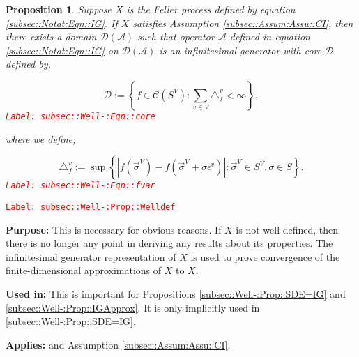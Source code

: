 \documentclass[12pt]{article}
\newcommand{\mc}{\mathcal}
\newcommand{\ep}{\epsilon}
\newcommand{\tr}{\textcolor{red}}
\newcommand{\labe}[1]{\tr{\texttt{Label: #1}}}
\newcommand{\purpose}{\textbf{Purpose: }}
\newcommand{\usein}{\textbf{Used in: }}
\newcommand{\app}{\textbf{Applies: }}
\newcommand{\defeq}{:=}								%
\renewcommand{\v}{v}							%
\renewcommand{\S}{S}							%
\newcommand{\s}{\sigma}							%
\newcommand{\sv}{\vec{\s}}						%
\newcommand{\ev}{\ep}							%
\newcommand{\X}{X}								%
\newcommand{\IG}{\mc{A}}						%
\newcommand{\f}{f}								%
\newcommand{\vind}[1]{^{#1}}					%
\newcommand{\carp}[1]{^{#1}}					%
\newcommand{\vsi}[1]{^{#1}}						%
\newcommand{\core}{\mc{D}}						%
\newcommand{\cont}{\mc{C}}						%
\newcommand{\delt}{\triangle}					%
\newcommand{\deltf}[1]{_{#1}}					%
\newtheorem{prop}[thms]{Proposition}
\begin{document}
\begin{prop}
Suppose \(\X\) is the Feller process defined by equation \eqref{subsec::Notat:Eqn::IG}. If \(\X\) satisfies Assumption \ref{subsec::Assum:Assu::CI}, then there exists a domain \(\core(\IG)\) such that operator \(\IG\) defined in equation \eqref{subsec::Notat:Eqn::IG} on \(\mc{D}(\IG)\) is an infinitesimal generator with core \(\core\) defined by,

\begin{equation}
\core \defeq \left\{f \in \cont(\S\carp{V}): \sum_{\v\in V} \delt\deltf{\f}\vind{\v} < \infty\right\},
\label{subsec::Well-:Eqn::core}
\end{equation}
\labe{subsec::Well-:Eqn::core}

where we define,

\begin{equation}
\delt\deltf{\f}\vind{\v} \defeq \sup\left\{|f(\sv\vsi{V}) - f(\sv\vsi{V}+\s\ev\vind{\v})|: \sv\vsi{V} \in \S\carp{V},\s \in \S\right\}.
\label{subsec::Well-:Eqn::fvar}
\end{equation}
\labe{subsec::Well-:Eqn::fvar}

\label{subsec::Well-:Prop::Welldef}
\end{prop}
\labe{subsec::Well-:Prop::Welldef}

\purpose This is necessary for obvious reasons. If \(\X\) is not well-defined, then there is no longer any point in deriving any results about its properties. The infinitesimal generator representation of \(\X\) is used to prove convergence of the finite-dimensional approximations of \(\X\) to \(\X\).

\usein This is important for Propositions \ref{subsec::Well-:Prop::SDE=IG} and \ref{subsec::Well-:Prop::IGApprox}. It is only implicitly used in \ref{subsec::Well-:Prop::SDE=IG}.

\app \cite[Theorem 3.9]{Lig85} and Assumption \ref{subsec::Assum:Assu::CI}.
\end{document}
